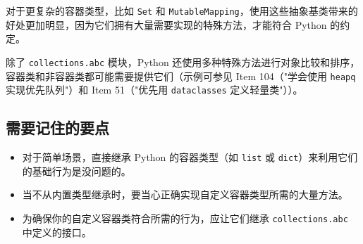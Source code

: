 对于更复杂的容器类型，比如 \texttt{Set} 和 \texttt{MutableMapping}，使用这些抽象基类带来的好处更加明显，因为它们拥有大量需要实现的特殊方法，才能符合 Python 的约定。

除了 \texttt{collections.abc} 模块，Python 还使用多种特殊方法进行对象比较和排序，容器类和非容器类都可能需要提供它们（示例可参见 Item 104（"学会使用 \texttt{heapq} 实现优先队列"）和 Item 51（"优先用 \texttt{dataclasses} 定义轻量类"））。

\subsection{需要记住的要点}

\begin{itemize}
\item 对于简单场景，直接继承 Python 的容器类型（如 \texttt{list} 或 \texttt{dict}）来利用它们的基础行为是没问题的。
\item 当不从内置类型继承时，要当心正确实现自定义容器类型所需的大量方法。
\item 为确保你的自定义容器类符合所需的行为，应让它们继承 \texttt{collections.abc} 中定义的接口。
\end{itemize}
